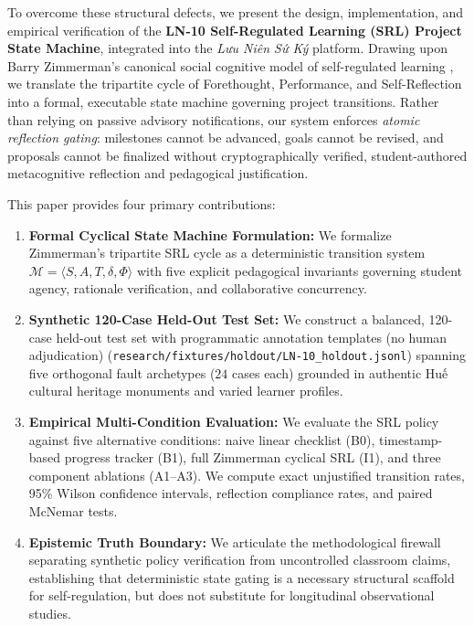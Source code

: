 \documentclass[11pt,a4paper]{article}
\begin{document}
To overcome these structural defects, we present the design, implementation, and empirical verification of the \textbf{LN-10 Self-Regulated Learning (SRL) Project State Machine}, integrated into the \textit{Lưu Niên Sứ Ký} platform. Drawing upon Barry Zimmerman's canonical social cognitive model of self-regulated learning \cite{zimmerman2000attaining, zimmerman2002becoming}, we translate the tripartite cycle of Forethought, Performance, and Self-Reflection into a formal, executable state machine governing project transitions. Rather than relying on passive advisory notifications, our system enforces \textit{atomic reflection gating}: milestones cannot be advanced, goals cannot be revised, and proposals cannot be finalized without cryptographically verified, student-authored metacognitive reflection and pedagogical justification.

This paper provides four primary contributions:
\begin{enumerate}
    \item \textbf{Formal Cyclical State Machine Formulation:} We formalize Zimmerman's tripartite SRL cycle as a deterministic transition system $\mathcal{M} = \langle S, A, T, \delta, \Phi \rangle$ with five explicit pedagogical invariants governing student agency, rationale verification, and collaborative concurrency.
    \item \textbf{Synthetic 120-Case Held-Out Test Set:} We construct a balanced, 120-case held-out test set with programmatic annotation templates (no human adjudication) (\texttt{research/fixtures/holdout/LN-10\_holdout.jsonl}) spanning five orthogonal fault archetypes ($24$ cases each) grounded in authentic Huế cultural heritage monuments and varied learner profiles.
    \item \textbf{Empirical Multi-Condition Evaluation:} We evaluate the SRL policy against five alternative conditions: naive linear checklist (B0), timestamp-based progress tracker (B1), full Zimmerman cyclical SRL (I1), and three component ablations (A1--A3). We compute exact unjustified transition rates, 95\% Wilson confidence intervals, reflection compliance rates, and paired McNemar tests.
    \item \textbf{Epistemic Truth Boundary:} We articulate the methodological firewall separating synthetic policy verification from uncontrolled classroom claims, establishing that deterministic state gating is a necessary structural scaffold for self-regulation, but does not substitute for longitudinal observational studies.
\end{enumerate}
\end{document}
